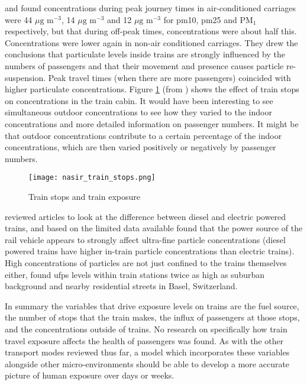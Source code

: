 \cite{Nasir2009} and \cite{Colbeck2010a} found concentrations during peak journey times in air-conditioned carriages were 44 $\mu \text{g m}^{-3}$, 14 $\mu \text{g m}^{-3}$ and 12 $\mu \text{g m}^{-3}$ for \gls{pm10}, \gls{pm25} and PM$_{1}$ respectively, but that during off-peak times, concentrations were about half this. Concentrations were lower again in non-air conditioned carriages. They drew the conclusions that particulate levels inside trains are strongly influenced by the numbers of passengers and that their movement and presence causes particle re-suspension. Peak travel times (when there are more passengers) coincided with higher particulate concentrations. Figure \ref{fig:nasirtrainstops} (from \cite{Nasir2009}) shows the effect of train stops on concentrations in the train cabin. It would have been interesting to see simultaneous outdoor concentrations to see how they varied to the indoor concentrations and more detailed information on passenger numbers. It might be that outdoor concentrations contribute to a certain percentage of the indoor concentrations, which are then varied positively or negatively by passenger numbers.

\begin{figure}[H]
\centering
\texttt{[image: nasir\_train\_stops.png]}
\caption{Train stops and train exposure}
\label{fig:nasirtrainstops}
\end{figure}

\cite{Knibbs2011} reviewed articles to look at the difference between diesel and electric powered trains, and based on the limited data available found that the power source of the rail vehicle appears to strongly affect ultra-fine particle concentrations (diesel powered trains have higher in-train particle concentrations than electric trains). High concentrations of particles are not just confined to the trains themselves either, \cite{Ragettli2013} found \gls{ufps} levels within train stations twice as high as suburban background and nearby residential streets in Basel, Switzerland.

In summary the variables that drive exposure levels on trains are the fuel source, the number of stops that the train makes, the influx of passengers at those stops, and the concentrations outside of trains. No research on specifically how train travel exposure affects the health of passengers was found. As with the other transport modes reviewed thus far, a model which incorporates these variables alongside other micro-environments should be able to develop a more accurate picture of human exposure over days or weeks.


